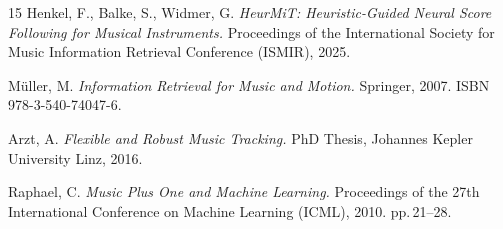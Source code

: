 \documentclass[a4paper,11pt]{article}
\begin{document}
\begin{thebibliography}{15}
  Henkel, F., Balke, S., Widmer, G.
  \textit{HeurMiT: Heuristic-Guided Neural Score Following for Musical Instruments.}
  Proceedings of the International Society for Music Information Retrieval Conference (ISMIR), 2025.

  Müller, M.
  \textit{Information Retrieval for Music and Motion.}
  Springer, 2007. ISBN 978-3-540-74047-6.

  Arzt, A.
  \textit{Flexible and Robust Music Tracking.}
  PhD Thesis, Johannes Kepler University Linz, 2016.

  Raphael, C.
  \textit{Music Plus One and Machine Learning.}
  Proceedings of the 27th International Conference on Machine Learning (ICML), 2010.
  pp.\,21--28.

\end{thebibliography}
\end{document}
